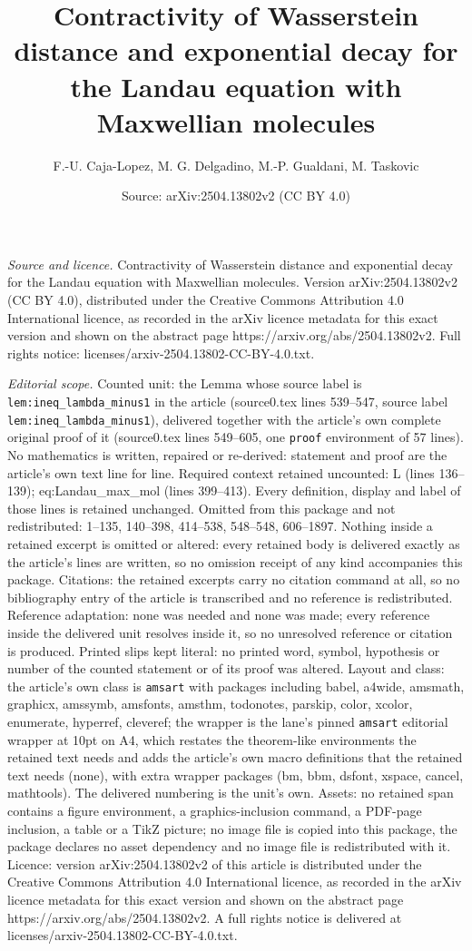 \documentclass[10pt,a4paper]{amsart}
\title[Contractivity of Wasserstein distance and exponential decay ]{Contractivity of Wasserstein distance and exponential decay for the Landau equation with Maxwellian molecules}
\author{F.-U. Caja-Lopez, M. G. Delgadino, M.-P. Gualdani, M. Taskovic}
\date{Source: arXiv:2504.13802v2 (CC BY 4.0)}
\begin{document}
\maketitle

\noindent\emph{Source and licence.} Contractivity of Wasserstein distance and exponential decay for the Landau equation with Maxwellian molecules. Version arXiv:2504.13802v2 (CC BY 4.0), distributed under the Creative Commons Attribution 4.0 International licence, as recorded in the arXiv licence metadata for this exact version and shown on the abstract page https://arxiv.org/abs/2504.13802v2. Full rights notice: licenses/arxiv-2504.13802-CC-BY-4.0.txt.\par\smallskip

\noindent\textit{Editorial scope.} Counted unit: the Lemma whose source label is \texttt{lem:ineq\_lambda\_minus1} in the article (source0.tex lines 539--547, source label \texttt{lem:ineq\_lambda\_minus1}), delivered together with the article's own complete original proof of it (source0.tex lines 549--605, one \texttt{proof} environment of 57 lines). No mathematics is written, repaired or re-derived: statement and proof are the article's own text line for line. Required context retained uncounted: L (lines 136--139); eq:Landau\_max\_mol (lines 399--413). Every definition, display and label of those lines is retained unchanged. Omitted from this package and not redistributed: 1--135, 140--398, 414--538, 548--548, 606--1897. Nothing inside a retained excerpt is omitted or altered: every retained body is delivered exactly as the article's lines are written, so no omission receipt of any kind accompanies this package. Citations: the retained excerpts carry no citation command at all, so no bibliography entry of the article is transcribed and no reference is redistributed. Reference adaptation: none was needed and none was made; every reference inside the delivered unit resolves inside it, so no unresolved reference or citation is produced. Printed slips kept literal: no printed word, symbol, hypothesis or number of the counted statement or of its proof was altered. Layout and class: the article's own class is \texttt{amsart} with packages including babel, a4wide, amsmath, graphicx, amssymb, amsfonts, amsthm, todonotes, parskip, color, xcolor, enumerate, hyperref, cleveref; the wrapper is the lane's pinned \texttt{amsart} editorial wrapper at 10pt on A4, which restates the theorem-like environments the retained text needs and adds the article's own macro definitions that the retained text needs (none), with extra wrapper packages (bm, bbm, dsfont, xspace, cancel, mathtools). The delivered numbering is the unit's own. Assets: no retained span contains a figure environment, a graphics-inclusion command, a PDF-page inclusion, a table or a TikZ picture; no image file is copied into this package, the package declares no asset dependency and no image file is redistributed with it. Licence: version arXiv:2504.13802v2 of this article is distributed under the Creative Commons Attribution 4.0 International licence, as recorded in the arXiv licence metadata for this exact version and shown on the abstract page https://arxiv.org/abs/2504.13802v2. A full rights notice is delivered at licenses/arxiv-2504.13802-CC-BY-4.0.txt. 
\end{document}
